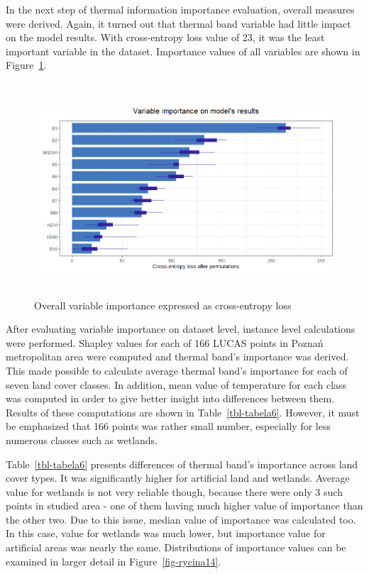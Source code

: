\documentclass{amuthesis}
\begin{document}
In the next step of thermal information importance evaluation, overall
measures were derived. Again, it turned out that thermal band variable
had little impact on the model results. With cross-entropy loss value of
23, it was the least important variable in the dataset. Importance
values of all variables are shown in Figure~\ref{fig-rycina13}.

\begin{figure}[H]

{\centering \includegraphics[width=5.625in,height=3.125in]{./figures/importance.png}

}

\caption{\label{fig-rycina13}Overall variable importance expressed as
cross-entropy loss}

\end{figure}

After evaluating variable importance on dataset level, instance level
calculations were performed. Shapley values for each of 166 LUCAS points
in Poznań metropolitan area were computed and thermal band's importance
was derived. This made possible to calculate average thermal band's
importance for each of seven land cover classes. In addition, mean value
of temperature for each class was computed in order to give better
insight into differences between them. Results of these computations are
shown in Table~\ref{tbl-tabela6}. However, it must be emphasized that
166 points was rather small number, especially for less numerous classes
such as wetlands.

Table~\ref{tbl-tabela6} presents differences of thermal band's
importance across land cover types. It was significantly higher for
artificial land and wetlands. Average value for wetlands is not very
reliable though, because there were only 3 such points in studied area -
one of them having much higher value of importance than the other two.
Due to this issue, median value of importance was calculated too. In
this case, value for wetlands was much lower, but importance value for
artificial areas was nearly the same. Distributions of importance values
can be examined in larger detail in Figure~\ref{fig-rycina14}.
\end{document}
